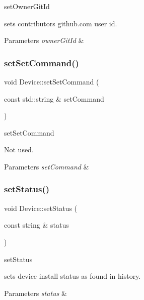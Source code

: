 set\+Owner\+Git\+Id 

sets contributors github.\+com user id. 
\begin{DoxyParams}{Parameters}
{\em owner\+Git\+Id} & \\
\hline
\end{DoxyParams}
\mbox{\label{classDevice_afad48633a288b303f88f7d607c64cca3}} 
\subsubsection{\texorpdfstring{set\+Set\+Command()}{setSetCommand()}}
{\footnotesize\ttfamily void Device\+::set\+Set\+Command (\begin{DoxyParamCaption}\item[{const std\+::string \&}]{set\+Command }\end{DoxyParamCaption})}



set\+Set\+Command 

Not used. 
\begin{DoxyParams}{Parameters}
{\em set\+Command} & \\
\hline
\end{DoxyParams}
\mbox{\label{classDevice_a46b5e30da5b43b09c0785a054bfb678a}} 
\subsubsection{\texorpdfstring{set\+Status()}{setStatus()}}
{\footnotesize\ttfamily void Device\+::set\+Status (\begin{DoxyParamCaption}\item[{const string \&}]{status }\end{DoxyParamCaption})}



set\+Status 

sets device install status as found in history. 
\begin{DoxyParams}{Parameters}
{\em status} & \\
\hline
\end{DoxyParams}
\mbox{\label{classDevice_ae70b727a6230454baccc6da6cfd819a7}} 
